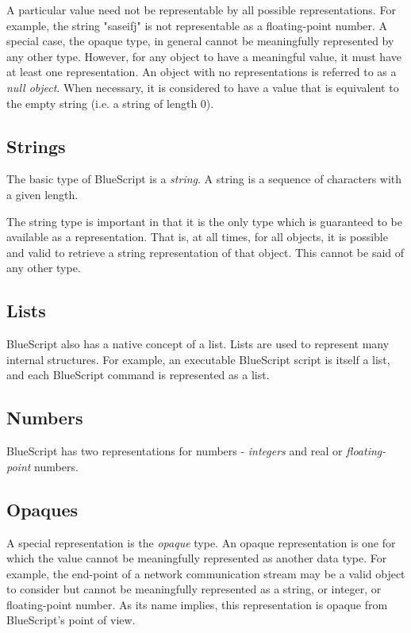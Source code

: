 \documentclass[10pt]{book}
\newcommand{\bsdefn}[1]{\textit{#1}}
\begin{document}
A particular value need not be representable by all possible representations.  For example, the string "saseifj" is not representable as a floating-point number.  A special case, the opaque type, in general cannot be meaningfully represented by any other type.  However, for any object to have a meaningful value, it must have at least one representation.
An object with no representations is referred to as a \bsdefn{null object}.  When necessary, it is considered to have a value that is equivalent to the empty string (i.e. a string of length 0).

\subsection{Strings}

The basic type of BlueScript is a \bsdefn{string}.  A string is a sequence of characters with a given length.

The string type is important in that it is the only type which is guaranteed to be available as a representation.  That is, at all times, for all objects, it is possible and valid to retrieve a string representation of that object.  This cannot be said of any other type.

\subsection{Lists}

BlueScript also has a native concept of a list.  Lists are used to represent many internal structures.  For example, an executable BlueScript script is itself a list, and each BlueScript command is represented as a list.

\subsection{Numbers}

BlueScript has two representations for numbers - \bsdefn{integers} and real or 
\bsdefn{floating-point} numbers.

\subsection{Opaques}

A special representation is the \bsdefn{opaque} type.  An opaque representation is one for which the  value cannot be meaningfully represented as another data type.  For example, the end-point of a network communication stream may be a valid object to consider but cannot be meaningfully represented as a string, or integer, or floating-point number.  As its name implies, this representation is opaque from BlueScript's point of view.
\end{document}
